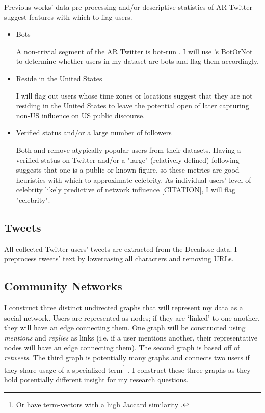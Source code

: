 \documentclass[acmlarge, screen, authorversion]{acmart}
\begin{document}
Previous works' \cite{bergerAltrightTwitterCensus2018, alizadehPsychologyMoralityPolitical2019} data pre-processing and/or descriptive statistics of AR Twitter suggest features with which to flag users.

\begin{itemize}
	\item Bots

	      A non-trivial segment of the AR Twitter is bot-run \cite{bergerAltrightTwitterCensus2018}. I will use \citet{davisBotOrNotSystemEvaluate2016}'s BotOrNot to determine whether users in my dataset are bots and flag them accordingly.

	\item Reside in the United States

	      I will flag out users whose time zones or locations suggest that they are not residing in the United States to leave the potential open of later capturing non-US influence on US public discourse.

	\item Verified status and/or a large number of followers

	      Both \citet{bergerAltrightTwitterCensus2018} and
	      \citet{alizadehPsychologyMoralityPolitical2019} remove atypically popular users from their datasets. Having a verified status on Twitter and/or a
	      "large" (relatively defined) following suggests that one is a public or
	      known figure, so these metrics are good heuristics with which to
	      approximate celebrity. As individual users' level of celebrity likely
	      predictive of network influence [CITATION], I will flag "celebrity".

\end{itemize}

\subsection{Tweets}

All collected Twitter users' tweets are extracted from the Decahose data. I preprocess tweets' text by lowercasing all characters and removing URLs.

\subsection{Community Networks}

I construct three distinct undirected graphs that will represent my data as a
social network. Users are represented as nodes; if they are `linked' to one
another, they will have an edge connecting them. One graph will be constructed
using \textit{mentions} and \textit{replies} as links (i.e. if a user mentions
another, their representative nodes will have an edge connecting them). The
second graph is based off of \textit{retweets}. The third graph is potentially
many graphs and connects two users if they share usage of a specialized
term\footnote{Or have term-vectors with a high Jaccard similarity
\cite{niwattanakulUsingJaccardCoefficient2013}.} . I construct these three
graphs as they hold potentially different insight for my research questions.
\end{document}
